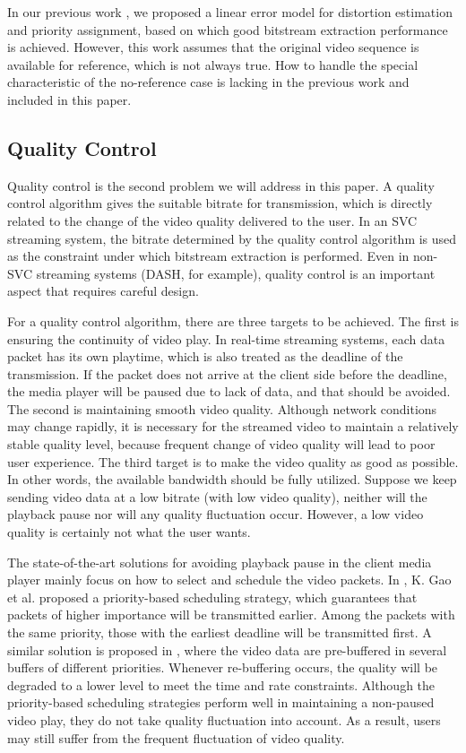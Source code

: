 \documentclass[journal]{IEEEtran}
\begin{document}
In our previous work \cite{Zhang12}, we proposed a linear error model for distortion estimation and priority assignment, based on which good bitstream extraction performance is achieved. However, this work assumes that the original video sequence is available for reference, which is not always true. How to handle the special characteristic of the no-reference case is lacking in the previous work and included in this paper.

\subsection{Quality Control}
\label{subsec:analysis-control}

Quality control is the second problem we will address in this paper. A quality control algorithm gives the suitable bitrate for transmission, which is directly related to the change of the video quality delivered to the user. In an SVC streaming system, the bitrate determined by the quality control algorithm is used as the constraint under which bitstream extraction is performed. Even in non-SVC streaming systems (DASH, for example), quality control is an important aspect that requires careful design.

For a quality control algorithm, there are three targets to be achieved. The first is ensuring the continuity of video play. In real-time streaming systems, each data packet has its own playtime, which is also treated as the deadline of the transmission. If the packet does not arrive at the client side before the deadline, the media player will be paused due to lack of data, and that should be avoided. The second is maintaining smooth video quality. Although network conditions may change rapidly, it is necessary for the streamed video to maintain a relatively stable quality level, because frequent change of video quality will lead to poor user experience. The third target is to make the video quality as good as possible. In other words, the available bandwidth should be fully utilized. Suppose we keep sending video data at a low bitrate (with low video quality), neither will the playback pause nor will any quality fluctuation occur. However, a low video quality is certainly not what the user wants.

The state-of-the-art solutions for avoiding playback pause in the client media player mainly focus on how to select and schedule the video packets. In \cite{Gao06}, K. Gao et al. proposed a priority-based scheduling strategy, which guarantees that packets of higher importance will be transmitted earlier. Among the packets with the same priority, those with the earliest deadline will be transmitted first. A similar solution is proposed in \cite{Schierl10}, where the video data are pre-buffered in several buffers of different priorities. Whenever re-buffering occurs, the quality will be degraded to a lower level to meet the time and rate constraints. Although the priority-based scheduling strategies perform well in maintaining a non-paused video play, they do not take quality fluctuation into account. As a result, users may still suffer from the frequent fluctuation of video quality.
\end{document}
